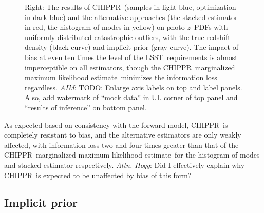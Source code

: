 \documentclass[iop]{emulateapj}
\newcommand{\todo}[3]{{\color{#2}\emph{#1}: #3}}
\newcommand{\aim}[1]{\todo{AIM}{red}{#1}}
\newcommand{\dwh}[1]{\todo{Attn. Hogg}{blue}{#1}}
\newcommand{\project}[1]{\textsc{#1}}
\newcommand{\lsst}{\project{LSST}}
\newcommand{\Chippr}{\project{CHIPPR}}%
\newcommand{\pz}{photo-$z$}
\newcommand{\pzpdf}{\pz\ PDF}%
\newcommand{\mmle}{marginalized maximum likelihood estimate}%
\begin{document}
\begin{figure}
\begin{center}
{		Right: The results of \Chippr\ (samples in light blue, optimization in dark blue) and the alternative approaches (the stacked estimator in red, the histogram of modes in yellow) on \pzpdf s with uniformly distributed catastrophic outliers, with the true redshift density (black curve) and implicit prior (gray curve).
		The impact of bias at even ten times the level of the \lsst\ requirements is almost imperceptible on all estimators, though the \Chippr\ \mmle\ minimizes the information loss regardless.
		\aim{TODO: Enlarge axis labels on top and label panels.
		Also, add watermark of ``mock data'' in UL corner of top panel and ``results of inference'' on bottom panel.}
	}
	\label{fig:bias}
	\end{center}
\end{figure}

As expected based on consistency with the forward model, \Chippr\ is completely resistant to bias, and the alternative estimators are only weakly affected, with information loss two and four times greater than that of the \Chippr\ \mmle\ for the histogram of modes and stacked estimator respectively.
\dwh{Did I effectively explain why \Chippr\ is expected to be unaffected by bias of this form?}

\subsection{Implicit prior}
\label{sec:interim}
\end{document}
